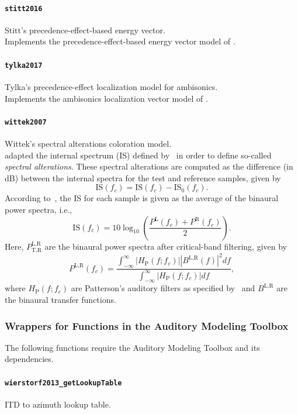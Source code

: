 \documentclass[11pt, oneside]{article}
\newcommand{\function}[1]{\paragraph*{\texttt{#1}}}
\begin{document}
\function{stitt2016} Stitt's precedence-effect-based energy vector. \\
Implements the precedence-effect-based energy vector model of \citet{Stitt2016}.

\function{tylka2017} Tylka's precedence-effect localization model for ambisonics. \\
Implements the ambisonics localization vector model of \citet{TylkaChoueiri2017a}.

\function{wittek2007} Wittek's spectral alterations coloration model. \\
\citet{Wittek2007} adapted the internal spectrum (IS) defined by~\citet[chapter~5]{Salomons1995PhD} in order to define so-called \textit{spectral alterations}.
These spectral alterations are computed as the difference (in dB) between the internal spectra for the test and reference samples, given by
\begin{equation}
\text{IS}(f_c) = \text{IS}(f_c) - \text{IS}_0(f_c).
\end{equation}
According to~\citet[section~3.2.5]{Wittek2007}, the IS for each sample is given as the average of the binaural power spectra, i.e.,
\begin{equation}
\text{IS}(f_c) = 10 \log_{10} \left( \frac{P^\text{L}(f_c) + P^\text{R}(f_c)}{2} \right).
\end{equation}
Here, $P_{\text{T},\text{R}}^{\text{L},\text{R}}$ are the binaural power spectra after critical-band filtering, given by~\citep[Eq.~(5.12)]{Salomons1995PhD}
\begin{equation}
P^{\text{L},\text{R}}(f_c) = \frac{\displaystyle \int_{-\infty}^\infty |H_\text{P}(f;f_c)| |B^{\text{L},\text{R}}(f)|^2 df}{\displaystyle \int_{-\infty}^\infty |H_\text{P}(f;f_c)| df},
\end{equation}
where $H_\text{P}(f;f_c)$ are Patterson's auditory filters as specified by~\citet[Eq.~(5.9)]{Salomons1995PhD}
and $B^{\text{L},\text{R}}$ are the binaural transfer functions.

\subsubsection{Wrappers for Functions in the Auditory Modeling Toolbox}

The following functions require the Auditory Modeling Toolbox and its dependencies.

\function{wierstorf2013\_getLookupTable} ITD to azimuth lookup table. \\
\end{document}
